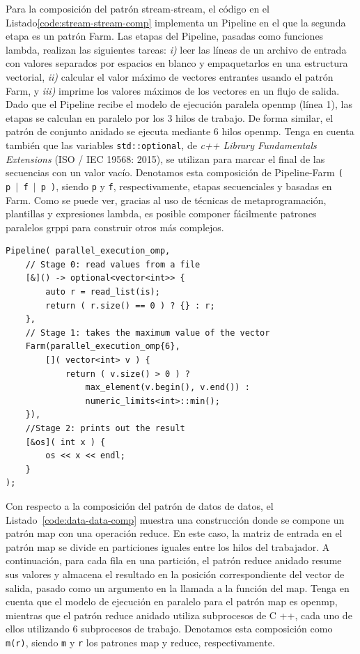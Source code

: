 Para la composición del patrón stream-stream, el código en el Listado\ref{code:stream-stream-comp} implementa un Pipeline en el que la segunda etapa es un patrón Farm. Las etapas del Pipeline, pasadas como funciones lambda, realizan las siguientes tareas: \emph{i)} leer las líneas de un archivo de entrada con valores separados por espacios en blanco y empaquetarlos en una estructura vectorial, \emph{ii)} calcular el valor máximo de vectores entrantes usando el patrón Farm, y \emph{iii)} imprime los valores máximos de los vectores en un flujo de salida. Dado que el Pipeline recibe el modelo de ejecución paralela \acrshort{openmp} (línea 1), las etapas se calculan en paralelo por los 3 hilos de trabajo. De forma similar, el patrón de conjunto anidado se ejecuta mediante 6 hilos \acrshort{openmp}. Tenga en cuenta también que las variables \texttt {std::optional}, de \emph{c++ Library Fundamentals Extensions} (ISO / IEC 19568: 2015), se utilizan para marcar el final de las secuencias con un valor vacío. Denotamos esta composición de Pipeline-Farm \texttt{(\,p\,$|$\,f\,$|$\,p\,)}, siendo \texttt{p} y \texttt{f}, respectivamente, etapas secuenciales y basadas en Farm. Como se puede ver, gracias al uso de técnicas de metaprogramación, plantillas y expresiones lambda, es posible componer fácilmente patrones paralelos \acrshort{grppi} para construir otros más complejos.

\vspace{0.35cm}
\begin{lstlisting}[frame=single,label={code:stream-stream-comp},caption={Ejemplo de composición Pipeline-Farm.}]
Pipeline( parallel_execution_omp,
    // Stage 0: read values from a file
    [&]() -> optional<vector<int>> {
        auto r = read_list(is);
        return ( r.size() == 0 ) ? {} : r; 
    },
    // Stage 1: takes the maximum value of the vector
    Farm(parallel_execution_omp{6}, 
        []( vector<int> v ) {
            return ( v.size() > 0 ) ? 
                max_element(v.begin(), v.end()) : 
                numeric_limits<int>::min();
    }),
    //Stage 2: prints out the result
    [&os]( int x ) {
        os << x << endl;
    }
);
\end{lstlisting}
\vspace{0.35cm}

Con respecto a la composición del patrón de datos de datos, el Listado~\ref{code:data-data-comp} muestra una construcción donde se compone un patrón map con una operación reduce. En este caso, la matriz de entrada en el patrón map se divide en particiones iguales entre los hilos del trabajador. A continuación, para cada fila en una partición, el patrón reduce anidado resume sus valores y almacena el resultado en la posición correspondiente del vector de salida, pasado como un argumento en la llamada a la función del map. Tenga en cuenta que el modelo de ejecución en paralelo para el patrón map es \acrshort{openmp}, mientras que el patrón reduce anidado utiliza subprocesos de C ++, cada uno de ellos utilizando 6 subprocesos de trabajo. Denotamos esta composición como \texttt{m(r)}, siendo \texttt{m} y \texttt{r} los patrones map y reduce, respectivamente.

